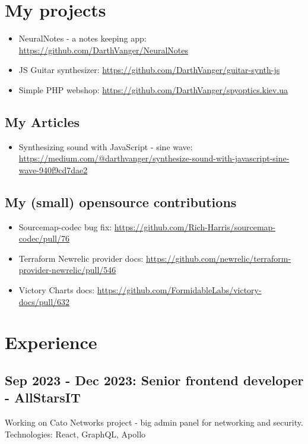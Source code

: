 \documentclass[a4paper, 14pt]{article}
\begin{document}
\section{My projects}
  \begin{itemize}
    \item NeuralNotes - a notes keeping app: \url{https://github.com/DarthVanger/NeuralNotes} \\
    \item JS Guitar synthesizer: \url{https://github.com/DarthVanger/guitar-synth-js} \\
    \item Simple PHP webshop: \url{https://github.com/DarthVanger/spyoptics.kiev.ua}
  \end{itemize}

  \subsection{My Articles}
    \begin{itemize}
      \item Synthesizing sound with JavaScript - sine wave: \url{https://medium.com/@darthvanger/synthesize-sound-with-javascript-sine-wave-940f9cd7dae2}
    \end{itemize}

  \subsection{My (small) opensource contributions}
    \begin{itemize}
      \item Sourcemap-codec bug fix: \url{https://github.com/Rich-Harris/sourcemap-codec/pull/76} \\
      \item Terraform Newrelic provider docs: \url{https://github.com/newrelic/terraform-provider-newrelic/pull/546} \\
      \item Victory Charts docs: \url{https://github.com/FormidableLabs/victory-docs/pull/632}
    \end{itemize}

\section{Experience}
  \subsection{Sep 2023 - Dec 2023: Senior frontend developer - AllStarsIT}
    Working on Cato Networks project - big admin panel for networking and security. \\
    Technologies: React, GraphQL, Apollo
\end{document}
